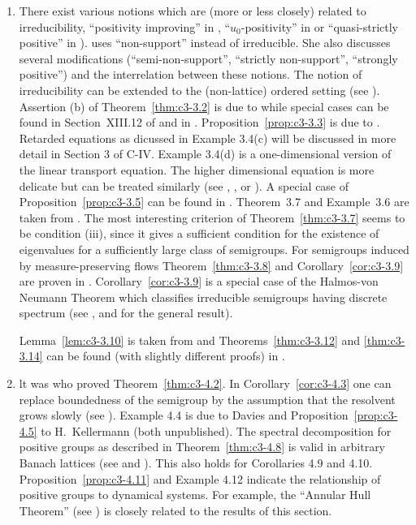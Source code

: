 \begin{enumerate}[label=\emph{Section \arabic*:}, wide, itemsep=1ex]
\item
There exist various notions which are (more or less closely) related to irreducibility, \eg \enquote{positivity improving} in \citet{reedsimon:1979}, \enquote{$u_0$-positivity} in 
\citet{krasnoselskii:1964}
or \enquote{quasi-strictly positive} in \citet{karlin:1959}). \citet{sawashima:1964} uses \enquote{non-support} instead of irreducible. 
She also discusses several modifications (\enquote{semi-non-support}, \enquote{strictly non-support}, \enquote{strongly positive}) and the interrelation between these notions. 
The notion of irreducibility can be extended to the (non-lattice) ordered setting (see \citet{battyrobinson:1984}). 
Assertion (b) of Theorem~\ref{thm:c3-3.2} is due to \citet{majewskirobinson:1983} while special cases can be found in Section~XIII.12 of \citet{reedsimon:1979} and in \citet{kishimotorobinson:1981}. 
Proposition~\ref{prop:c3-3.3} is due to \citet{voigt:1984a}. 
Retarded equations as dicussed in Example 3.4(c) will be discussed in more detail in Section 3 of C-IV. Example 3.4(d) is a one-dimensional version of the linear transport equation. 
The higher dimensional equation is more delicate but can be treated similarly (see \eg \citet{greiner:1984b}, \citet{kaperetal:1983a}, or \citet{voigt:1984b}). 
A special case of Proposition~\ref{prop:c3-3.5} can be found in \citet{davies:1980}. 
Theorem~3.7 and Example~3.6 are taken from \citet{schaefer:1985}. 
The most interesting criterion of Theorem~\ref{thm:c3-3.7} seems to be condition (iii), since it gives a sufficient condition for the existence of eigenvalues for a sufficiently large class of semigroups. 
For semigroups induced by measure-preserving flows Theorem~\ref{thm:c3-3.8} and Corollary~\ref{cor:c3-3.9} are proven in \citet{cornfeldetal:1982}. 
Corollary~\ref{cor:c3-3.9} is a special case of the Halmos-von Neumann Theorem which classifies irreducible semigroups having discrete spectrum (see \citet{cornfeldetal:1982}, \citet{greiner:1982} and \citet{schaefer:1974} for the general result). 

Lemma~\ref{lem:c3-3.10} is taken from 
\citet{groh:1984b}
and Theorems~\ref{thm:c3-3.12} and \ref{thm:c3-3.14} can be found (with slightly different proofs) in \citet{greiner:1981}. 

\item 
lt was \citet{derndinger:1980} who proved Theorem~\ref{thm:c3-4.2}. 
In Corollary~\ref{cor:c3-4.3} one can replace boundedness of the semigroup by the assumption that the resolvent grows slowly (see \citet{greiner:1982}). 
Example 4.4 is due to Davies and Proposition~\ref{prop:c3-4.5} to H.~Kellermann (both unpublished). 
The spectral decomposition for positive groups as described in Theorem~\ref{thm:c3-4.8} is valid in arbitrary Banach lattices (see \citet{arendt:1982} and \citet{greiner:1984c}). 
This also holds for Corollaries 4.9 and 4.10. 
Proposition~\ref{prop:c3-4.11} and Example 4.12 indicate the relationship of positive groups to dynamical systems. 
For example, the \enquote{Annular Hull Theorem} (see \citet{chiconeswanson:1981}) is closely related to the results of this section.
\end{enumerate}

